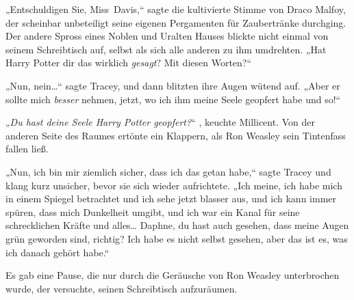 „Entschuldigen Sie, Miss~Davis,“ sagte die kultivierte Stimme von Draco Malfoy, der scheinbar unbeteiligt seine eigenen Pergamenten für Zaubertränke durchging. Der andere Spross eines Noblen und Uralten Hauses blickte nicht einmal von seinem Schreibtisch auf, selbst als sich alle anderen zu ihm umdrehten. „Hat Harry Potter dir das wirklich \emph{gesagt}? Mit diesen Worten?“

„Nun, nein…“ sagte Tracey, und dann blitzten ihre Augen wütend auf. „Aber er sollte mich \emph{besser} nehmen, jetzt, wo ich ihm meine Seele geopfert habe und so!“

„\emph{Du hast deine Seele Harry Potter geopfert?}“ , keuchte Millicent. Von der anderen Seite des Raumes ertönte ein Klappern, als Ron Weasley sein Tintenfass fallen ließ.

„Nun, ich bin mir ziemlich sicher, dass ich das getan habe,“ sagte Tracey und klang kurz unsicher, bevor sie sich wieder aufrichtete. „Ich meine, ich habe mich in einem Spiegel betrachtet und ich sehe jetzt blasser aus, und ich kann immer spüren, dass mich Dunkelheit umgibt, und ich war ein Kanal für seine schrecklichen Kräfte und alles… Daphne, du hast auch gesehen, dass meine Augen grün geworden sind, richtig? Ich habe es nicht selbst gesehen, aber das ist es, was ich danach gehört habe.“

Es gab eine Pause, die nur durch die Geräusche von Ron Weasley unterbrochen wurde, der versuchte, seinen Schreibtisch aufzuräumen.

